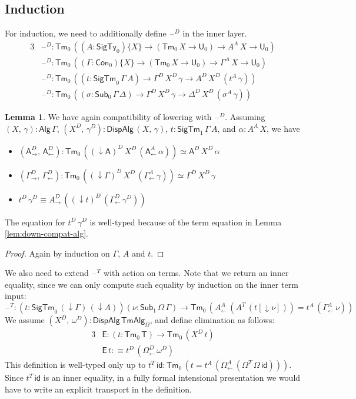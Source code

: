 \documentclass[12pt,a4paper,twoside,openany]{book}
\theoremstyle{remark}
\theoremstyle{definition}
\newtheorem{mylemma}{Lemma}
\theoremstyle{theorem}
\newcommand{\ms}[1]{\mathsf{#1}}
\newcommand{\id}{\mathsf{id}}
\newcommand{\Con}{\mathsf{Con}}
\newcommand{\Sub}{\mathsf{Sub}}
\newcommand{\Tm}{\mathsf{Tm}}
\newcommand{\U}{\mathsf{U}}
\newcommand{\blank}{\mathord{\hspace{1pt}\text{--}\hspace{1pt}}}
\newcommand{\SigTy}{\mathsf{SigTy}}
\newcommand{\SigTm}{\mathsf{SigTm}}
\newcommand{\A}{\mathsf{A}}
\newcommand{\Alg}{\ms{Alg}}
\newcommand{\DispAlg}{\ms{DispAlg}}
\newcommand{\TmAlg}{\ms{TmAlg}}
\newcommand{\down}{\downarrow}
\newcommand{\defn}{:\equiv}
\begin{document}
\subsection{Induction}

For induction, we need to additionally define $\blank^D$ in the inner layer.
\begin{alignat*}{3}
  &\blank^D : \Tm_0\,((A : \SigTy_0)\{X\} \to (\Tm_0\,X \to \U_0) \to A^A\,X \to \U_0)\\
  &\blank^D : \Tm_0\,((\Gamma : \Con_0)\{X\} \to (\Tm_0\,X \to \U_0) \to \Gamma^A\,X \to \U_0)\\
  &\blank^D : \Tm_0\,((t : \SigTm_0\,\Gamma\,A) \to \Gamma^D\,X^D\,\gamma \to A^D\,X^D\,(t^A\,\gamma))\\
  &\blank^D : \Tm_0\,((\sigma : \Sub_0\,\Gamma\,\Delta) \to \Gamma^D\,X^D\,\gamma \to \Delta^D\,X^D\,(\sigma^A\,\gamma))
\end{alignat*}

\begin{mylemma}
We have again compatibility of lowering with $\blank^D$. Assuming
$(X,\,\gamma) : \Alg\,\Gamma$, $(X^D,\,\gamma^D) : \DispAlg\,(X,\,\gamma)$,
$t : \SigTm_1\,\Gamma\,A$, and $\alpha : A^A\,X$, we have
\begin{itemize}
  \item $(\A^D_{\to},\,\A^D_{\leftarrow}) :
    \Tm_0\,((\down\!\A)^D\,X^D\,(\A^A_{\leftarrow}\,\alpha)) \simeq \A^D\,X^D\,\alpha$
  \item $(\Gamma^D_{\to},\,\Gamma^D_{\leftarrow}) :
    \Tm_0\,((\down\!\Gamma)^D\,X^D\,(\Gamma^A_{\leftarrow}\,\gamma)) \simeq \Gamma^D\,X^D\,\gamma$
  \item $t^D\,\gamma^D \equiv A^D_{\to}\,((\down\!t)^D\,(\Gamma^D_{\leftarrow}\,\gamma^D))$
\end{itemize}
The equation for $t^D\,\gamma^D$ is well-typed because of the term equation in Lemma
\ref{lem:down-compat-alg}.
\end{mylemma}
\begin{proof} Again by induction on $\Gamma$, $A$ and $t$.
\end{proof}

We also need to extend $\blank^T$ with action on terms. Note that we return
an inner equality, since we can only compute such equality by induction on the
inner term input:
\[
\blank^T : (t : \SigTm_0\,(\down\!\Gamma)\,(\down\!A))(\nu : \Sub_1\,\Omega\,\Gamma) \to
  \Tm_0\,(A^A_{\leftarrow}\,(A^T\,(t[\down\!\nu])) = t^A\,(\Gamma^A_{\leftarrow}\,\nu))
\]
We assume $(X^D,\,\omega^D) : \DispAlg\,\TmAlg_\Omega$, and define elimination
as follows:
\begin{alignat*}{3}
  & \ms{E} : (t : \Tm_0\,\ms{T}) \to \Tm_0\,(X^D\,t) \\
  & \ms{E}\,t \defn t^D\,(\Omega^D_{\leftarrow}\,\omega^D)
\end{alignat*}
This definition is well-typed only up to $t^T\,\id : \Tm_0\,(t =
t^A\,(\Omega^A_{\leftarrow}\,(\Omega^T\,\Omega\,\id)))$. Since $t^T\,\id$ is an
inner equality, in a fully formal intensional presentation we would have to
write an explicit transport in the definition.
\end{document}
